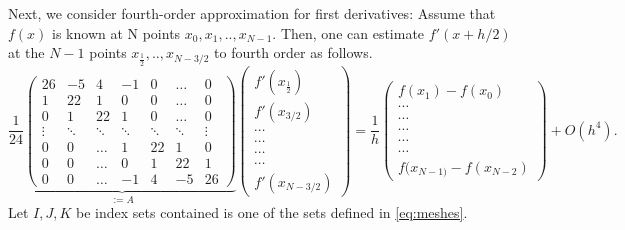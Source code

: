 \documentclass[12pt,reqno]{amsart}
\newtheorem{rem}[theorem]{Remark}
\theoremstyle{definition}
\numberwithin{equation}{section}
\begin{document}
	Next, we consider fourth-order approximation for first derivatives:
	Assume that $f(x)$ is known at N points $x_0,x_1, ..,x_{N-1}$. Then,  one can  estimate  $f'(x+h/2)$ at the $N-1$ points 	$x_{\frac{1}{2}},..,x_{N-3/2}$ to fourth order as follows.
		\begin{equation}\label{eq:lhs}
		\underbrace{
		\frac{1}{24}
		\begin{pmatrix}
			26     & -5     & 4      & -1     & 0      & \dots  & 0      \\
			1      & 22     & 1      & 0      & 0      & \dots  & 0      \\
			0      & 1      & 22     & 1      & 0      & \dots  & 0      \\
			\vdots & \ddots & \ddots & \ddots & \ddots & \ddots & \vdots \\
			0      & 0      & \dots  & 1      & 22     & 1      & 0      \\
			0      & 0      & \dots  & 0      & 1      & 22     & 1      \\
			0      & 0      & \dots  & -1     & 4      & -5     & 26
		\end{pmatrix}}_{:=A}
		\begin{pmatrix}
			f'(x_{\frac{1}{2}}) \\
			f'(x_{3/2}) \\
			\cdots \\
			\cdots\\
			\cdots \\
			\cdots \\
			f'(x_{N-3/2})
		\end{pmatrix}=
		\frac{1}{h}
		\begin{pmatrix}
			f(x_{1})-f(x_0)  \\
			\cdots \\
			\cdots\\
			\cdots \\
			\cdots \\
			\cdots \\
			f(x_{N-1)}-f(x_{N-2})
		\end{pmatrix}+O(h^4).
	\end{equation}
%	
Let $I,J,K$ be index sets   contained is one of the sets defined in \eqref{eq:meshes}.
\end{document}
